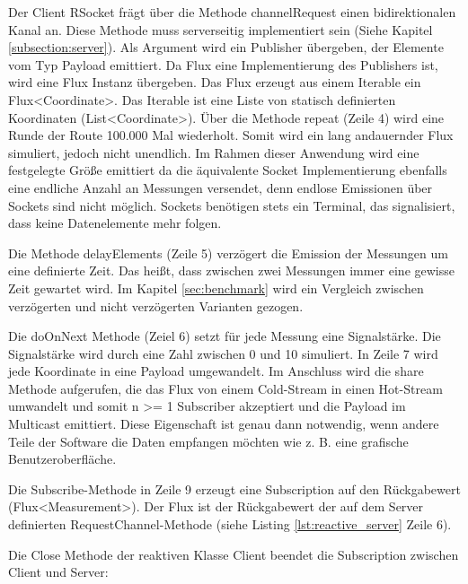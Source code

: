 Der Client RSocket frägt über die Methode channelRequest einen bidirektionalen Kanal an. Diese Methode muss serverseitig implementiert sein (Siehe Kapitel \ref{subsection:server}). Als Argument wird ein Publisher übergeben, der Elemente vom Typ Payload emittiert. Da Flux eine Implementierung des Publishers ist, wird eine Flux Instanz übergeben. Das Flux erzeugt aus einem Iterable ein Flux<Coordinate>. Das Iterable ist eine Liste von statisch definierten Koordinaten (List<Coordinate>). Über die Methode repeat (Zeile 4) wird eine Runde der Route 100.000 Mal wiederholt. Somit wird ein lang andauernder Flux simuliert, jedoch nicht unendlich. Im Rahmen dieser Anwendung wird eine festgelegte Größe emittiert da die äquivalente Socket Implementierung ebenfalls eine endliche Anzahl an Messungen versendet, denn endlose Emissionen über Sockets sind nicht möglich. Sockets benötigen stets ein Terminal, das signalisiert, dass keine Datenelemente mehr folgen. 

Die Methode delayElements (Zeile 5) verzögert die Emission der Messungen um eine definierte Zeit. Das heißt, dass zwischen zwei Messungen immer eine gewisse Zeit gewartet wird. Im Kapitel \ref{sec:benchmark} wird ein Vergleich zwischen verzögerten und nicht verzögerten Varianten gezogen. 

Die doOnNext Methode (Zeiel 6) setzt für jede Messung eine Signalstärke. Die Signalstärke wird durch eine Zahl zwischen 0 und 10 simuliert. In Zeile 7 wird jede Koordinate in eine Payload umgewandelt. Im Anschluss wird die share Methode aufgerufen, die das Flux von einem Cold-Stream in einen Hot-Stream umwandelt und somit n >= 1 Subscriber akzeptiert und die Payload im Multicast emittiert. Diese Eigenschaft ist genau dann notwendig, wenn andere Teile der Software die Daten empfangen möchten wie z. B. eine grafische Benutzeroberfläche. 

Die Subscribe-Methode in Zeile 9 erzeugt eine Subscription auf den Rückgabewert (Flux<Measurement>). Der Flux ist der Rückgabewert der auf dem Server definierten RequestChannel-Methode (siehe Listing \ref{lst:reactive_server} Zeile 6). 

Die Close Methode der reaktiven Klasse Client beendet die Subscription zwischen Client und Server:



